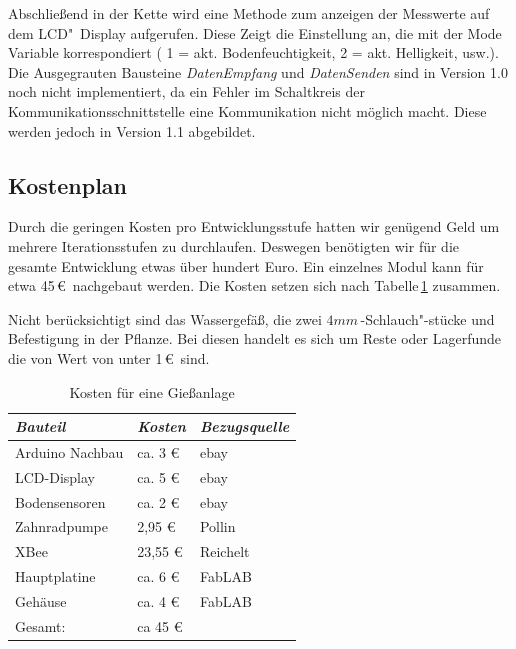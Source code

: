 Abschließend in der Kette wird eine Methode zum anzeigen der Messwerte auf dem LCD"~Display aufgerufen. Diese Zeigt die Einstellung an, die mit der Mode Variable korrespondiert ( 1 = akt. Bodenfeuchtigkeit, 2 = akt.  Helligkeit, usw.). Die Ausgegrauten Bausteine \emph{DatenEmpfang} und \emph{DatenSenden} sind in Version 1.0 noch nicht implementiert, da ein Fehler im Schaltkreis der Kommunikationsschnittstelle eine Kommunikation nicht möglich macht. Diese werden jedoch in Version 1.1 abgebildet.

	

	
\subsection{Kostenplan}
 Durch die geringen Kosten pro Entwicklungsstufe hatten wir genügend Geld um mehrere Iterationsstufen  zu durchlaufen.
 Deswegen benötigten wir für die gesamte Entwicklung etwas über hundert Euro.
 Ein einzelnes Modul kann für etwa 45\,\euro\ nachgebaut werden. 
 Die Kosten setzen sich nach Tabelle\,\ref{Kosten für eine Giessanlage} zusammen.
 
 Nicht berücksichtigt sind das Wassergefäß, die zwei \begin{math}4mm\end{math}\,-Schlauch"-stücke und Befestigung in der Pflanze.
 Bei diesen handelt es sich um Reste oder Lagerfunde die von Wert von unter 1\,\euro\ sind. 
 
\begin{table}[ht]
	\centering
	\onehalfspacing
	\footnotesize
	\caption{Kosten für eine Gießanlage}
	\label{Kosten für eine Giessanlage}
		\begin{tabular}{|l|ll|}
			\hline
\textit{Bauteil} & \textit{Kosten} & \textit{Bezugsquelle} \\
\hline
Arduino Nachbau & ca. 3 \euro & ebay \\
LCD-Display & ca. 5 \euro & ebay\\
Bodensensoren & ca. 2 \euro & ebay \\
Zahnradpumpe & 2,95 \euro & Pollin \\
XBee &  23,55 \euro & Reichelt \\
Hauptplatine & ca. 6 \euro & FabLAB \\
Gehäuse	& ca. 4 \euro & FabLAB \\

\hline
Gesamt: & ca 45 \euro & \\
\hline
\end{tabular}
\end{table}
